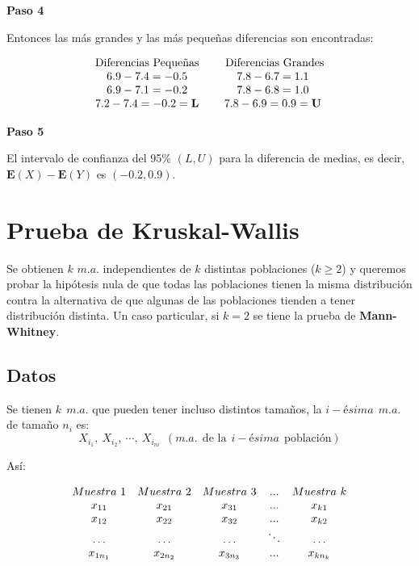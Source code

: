 \documentclass[
  a4paper,
  oneside,
  openany]{book}
\begin{document}
\textbf{Paso 4}

Entonces las más grandes y las más pequeñas diferencias son encontradas:

\[
\begin{array}{c c c c}
\mbox{Diferencias Pequeñas} & & \mbox{ Diferencias Grandes} \\
6.9 - 7.4 = -0.5 & & 7.8 - 6.7 = 1.1\\
6.9 - 7.1 = -0.2 & & 7.8 - 6.8 = 1.0\\
7.2 - 7.4 = -0.2 = \textbf{L} & & 7.8 - 6.9 = 0.9 = \textbf{U}\\
\end{array}
\]

\textbf{Paso 5}

El intervalo de confianza del 95\% \((L,U)\) para la diferencia de medias, es decir, \(\mathbf{E}(X)-\mathbf{E}(Y)\) es \((-0.2,0.9)\).

\hypertarget{prueba-de-kruskal-wallis}{%
\chapter{Prueba de Kruskal-Wallis}\label{prueba-de-kruskal-wallis}}

Se obtienen \(k\) \(m.a.\) independientes de \(k\) distintas poblaciones (\(k\geq 2\)) y queremos probar la hipótesis nula de que todas las poblaciones tienen la misma distribución contra la alternativa de que algunas de las poblaciones tienden a tener distribución distinta.
Un caso particular, si \(k=2\) se tiene la prueba de \textbf{Mann-Whitney}.

\hypertarget{datos-7}{%
\section{Datos}\label{datos-7}}

Se tienen \(k\ \ m.a.\) que pueden tener incluso distintos tamaños, la \(i-ésima\ \ m.a.\) de tamaño \(n_{i}\) es:
\[X_{i_1},\ X_{i_2},\ \cdots, \ X_{i_{ni}} \ \ (m.a. \ \ \mbox{de la} \ \ i-ésima \ \ \mbox{población})\]

Así:

\[
\begin{array}{c c c c c} 
Muestra \ 1&Muestra\ 2&Muestra\ 3&...&Muestra\ k \\
x_{11}&x_{21}&x_{31}&...&x_{k1}\\
x_{12}&x_{22}&x_{32}&...&x_{k2}\\
\ldots&\ldots&\ldots&\ddots&\ldots\\
x_{1n_1}&x_{2n_2}&x_{3n_3}&...&x_{kn_k}\\
\end{array}
\]
\end{document}
